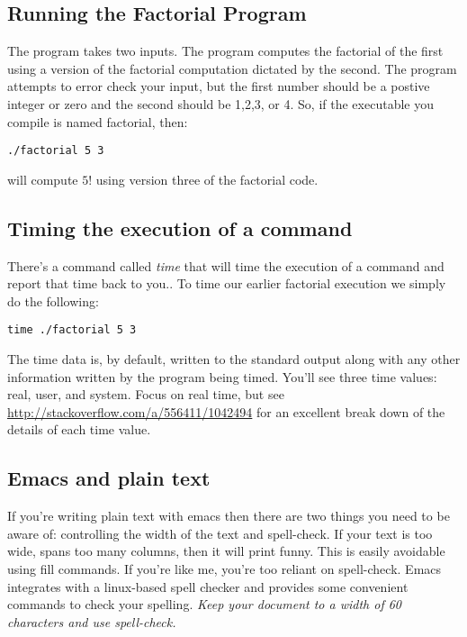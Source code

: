 \documentclass[]{tufte-handout}
\begin{document}
\subsection{Running the Factorial Program}

The program takes two inputs. The program computes the factorial of the first using a version of the factorial computation dictated by the second. The program attempts to error check your input, but the first number should be a postive integer or zero and the second should be 1,2,3, or 4. So, if the executable you compile is named factorial, then:
\begin{verbatim}
./factorial 5 3
\end{verbatim}
will compute $5!$ using version three of the factorial code. 

\subsection{Timing the execution of a command}

There's a command called \textit{time} that will time the execution of a command and report that time back to you.. To time our earlier factorial execution we simply do the following:
\begin{verbatim}
time ./factorial 5 3
\end{verbatim}
The time data is, by default, written to the standard output along with any other information written by the program being timed. You'll see three time values: real, user, and system. Focus on real time, but see \url{http://stackoverflow.com/a/556411/1042494} for an excellent break down of the details of each time value.


\subsection{Emacs and plain text}

If you're writing plain text with emacs then there are two things you need to be aware of: controlling the width of the text and spell-check. If your text is too wide, spans too many columns, then it will print funny.  This is easily avoidable using fill commands. If you're like me, you're too reliant on spell-check.  Emacs integrates with a linux-based spell checker and provides some convenient commands to check your spelling. \textit{Keep your document to a width of 60 characters and use spell-check.}
\end{document}
